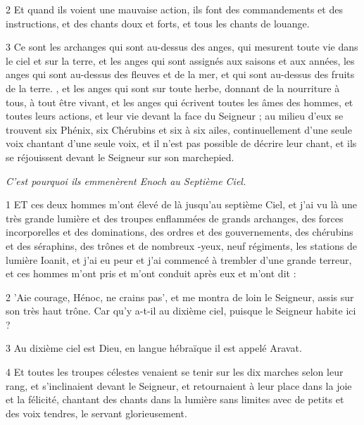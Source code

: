 \par 2 Et quand ils voient une mauvaise action, ils font des commandements et des instructions, et des chants doux et forts, et tous les chants de louange.

\par 3 Ce sont les archanges qui sont au-dessus des anges, qui mesurent toute vie dans le ciel et sur la terre, et les anges qui sont assignés aux saisons et aux années, les anges qui sont au-dessus des fleuves et de la mer, et qui sont au-dessus des fruits de la terre. , et les anges qui sont sur toute herbe, donnant de la nourriture à tous, à tout être vivant, et les anges qui écrivent toutes les âmes des hommes, et toutes leurs actions, et leur vie devant la face du Seigneur ; au milieu d'eux se trouvent six Phénix, six Chérubins et six à six ailes, continuellement d'une seule voix chantant d'une seule voix, et il n'est pas possible de décrire leur chant, et ils se réjouissent devant le Seigneur sur son marchepied.


\par \textit{C'est pourquoi ils emmenèrent Enoch au Septième Ciel.}

\par 1 ET ces deux hommes m'ont élevé de là jusqu'au septième Ciel, et j'ai vu là une très grande lumière et des troupes enflammées de grands archanges, des forces incorporelles et des dominations, des ordres et des gouvernements, des chérubins et des séraphins, des trônes et de nombreux -yeux, neuf régiments, les stations de lumière Ioanit, et j'ai eu peur et j'ai commencé à trembler d'une grande terreur, et ces hommes m'ont pris et m'ont conduit après eux et m'ont dit :

\par 2 'Aie courage, Hénoc, ne crains pas', et me montra de loin le Seigneur, assis sur son très haut trône. Car qu’y a-t-il au dixième ciel, puisque le Seigneur habite ici ?

\par 3 Au dixième ciel est Dieu, en langue hébraïque il est appelé Aravat.

\par 4 Et toutes les troupes célestes venaient se tenir sur les dix marches selon leur rang, et s'inclinaient devant le Seigneur, et retournaient à leur place dans la joie et la félicité, chantant des chants dans la lumière sans limites avec de petits et des voix tendres, le servant glorieusement.

